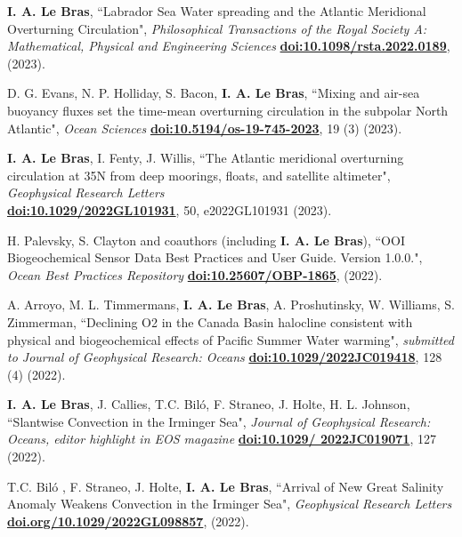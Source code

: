 \documentclass[paper=letter,fontsize=11pt]{scrartcl} %
\newcommand{\PaperEntry}[6]{
		\noindent #1, ``#2", \textit{#3} \textbf{#4}, #5 (#6).}
\begin{document}


\begin{etaremune}

\item \PaperEntry{\textbf{I. A. Le Bras}}{Labrador Sea Water spreading and the Atlantic Meridional Overturning Circulation}{Philosophical Transactions of the Royal Society A: Mathematical, Physical and Engineering Sciences}{\url{doi:10.1098/rsta.2022.0189}}{}{2023}

\item \PaperEntry{D. G. Evans, N. P. Holliday, S. Bacon, \textbf{I. A. Le Bras}}{Mixing and air-sea buoyancy fluxes set the time-mean overturning circulation in the subpolar North Atlantic}{Ocean Sciences}{\url{doi:10.5194/os-19-745-2023}}{19 (3)}{2023}

\item \PaperEntry{\textbf{I. A. Le Bras}, I. Fenty, J. Willis}{The Atlantic meridional overturning circulation at 35N from deep moorings, floats, and satellite altimeter}{Geophysical Research Letters\\}{\url{doi:10.1029/2022GL101931}}{50, e2022GL101931}{2023}

\item \PaperEntry{H. Palevsky, S. Clayton and coauthors (including \textbf{I. A. Le Bras})}{OOI Biogeochemical Sensor Data Best Practices and User Guide. Version 1.0.0.}{Ocean Best Practices Repository}{\url{doi:10.25607/OBP-1865}}{}{2022}

\item \PaperEntry{A. Arroyo, M. L. Timmermans, \textbf{I. A. Le Bras}, A. Proshutinsky, W. Williams, S. Zimmerman}{Declining O2 in the Canada Basin halocline consistent with physical and biogeochemical effects of Pacific Summer Water warming}{submitted to Journal of Geophysical Research: Oceans}{\url{doi:10.1029/2022JC019418}}{128 (4)}{2022}

\item \PaperEntry{\textbf{I. A. Le Bras}, J. Callies, T.C. Bil\'{o}, F. Straneo, J. Holte, H. L. Johnson}{Slantwise Convection in the Irminger Sea}{Journal of Geophysical Research: Oceans, editor highlight in EOS magazine}{\url{doi:10.1029/ 2022JC019071}}{127}{2022}

\item \PaperEntry{T.C. Bil\'{o} , F. Straneo, J. Holte, \textbf{I. A. Le Bras}}{Arrival of New Great Salinity Anomaly Weakens Convection in the Irminger Sea}{Geophysical Research Letters\\}{\url{doi.org/10.1029/2022GL098857}}{}{2022}


\end{etaremune}
\end{document}
